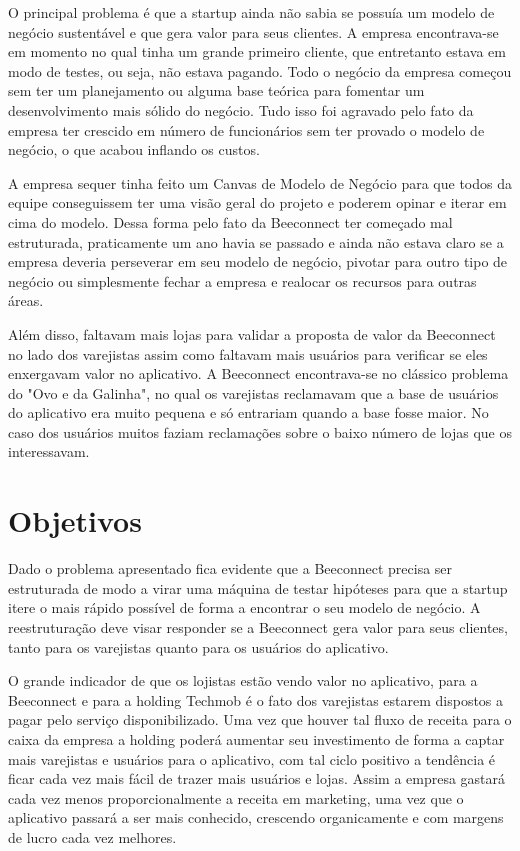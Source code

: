 O principal problema é que a startup ainda não sabia se possuía um modelo de negócio sustentável e que gera valor para seus clientes. A empresa encontrava-se em momento no qual tinha um grande primeiro cliente, que entretanto estava em modo de testes, ou seja, não estava pagando.
Todo o negócio da empresa começou sem ter um planejamento ou alguma base teórica para fomentar um desenvolvimento mais sólido do negócio. Tudo isso foi agravado pelo fato da empresa ter crescido em número de funcionários sem ter provado o modelo de negócio, o que acabou inflando os custos.

A empresa sequer tinha feito um Canvas de Modelo de Negócio para que todos da equipe conseguissem ter uma visão geral do projeto e poderem opinar e iterar em cima do modelo. Dessa forma pelo fato da Beeconnect ter começado mal estruturada, praticamente um ano havia se passado e ainda não estava claro se a empresa deveria perseverar em seu modelo de negócio, pivotar para outro tipo de negócio ou simplesmente fechar a empresa e realocar os recursos para outras áreas.

Além disso, faltavam mais lojas para validar a proposta de valor da Beeconnect no lado dos varejistas assim como faltavam mais usuários para verificar se eles enxergavam valor no aplicativo. A Beeconnect encontrava-se no clássico problema do "Ovo e da Galinha", no qual os varejistas reclamavam que a base de usuários do aplicativo era muito pequena e só entrariam quando a base fosse maior. No caso dos usuários muitos faziam reclamações sobre o baixo número de lojas que os interessavam.

\section[Objetivos]{Objetivos}
\label{chap:objetivos}
Dado o problema apresentado fica evidente que a Beeconnect precisa ser estruturada de modo a virar uma máquina de testar hipóteses para que a startup itere o mais rápido possível de forma a encontrar o seu modelo de negócio.
A reestruturação deve visar responder se a Beeconnect gera valor para seus clientes, tanto para os varejistas quanto para os usuários do aplicativo. 

O grande indicador de que os lojistas estão vendo valor no aplicativo, para a Beeconnect e para a holding Techmob é o fato dos varejistas estarem dispostos a pagar pelo serviço disponibilizado. Uma vez que houver tal fluxo de receita para o caixa da empresa a holding poderá aumentar seu investimento de forma a captar mais varejistas e usuários para o aplicativo, com tal ciclo positivo a tendência é ficar cada vez mais fácil de trazer mais usuários e lojas. Assim a empresa gastará cada vez menos proporcionalmente a receita em marketing, uma vez que o aplicativo passará a ser mais conhecido, crescendo organicamente e com margens de lucro cada vez melhores. 

